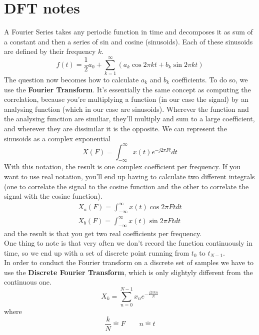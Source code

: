 \section{DFT notes}
 A Fourier Series takes any periodic function in time and decomposes it as sum of a constant and then a series of sin and cosine (sinusoids). Each of these sinusoids are defined by their frequency $k$. 
 \begin{equation}
     f(t) = \frac{1}{2}a_0 + \sum_{k=1}^\infty (a_k \cos 2 \pi k t + b_k \sin 2\pi kt)
 \end{equation} 
 The question now becomes how to calculate $a_k$ and $b_k$ coefficients. To do so, we use the \textbf{Fourier Transform}. It's essentially the same concept as computing the correlation, because you're multiplying a function (in our case the signal) by an analysing function (which in our case are sinusoids). Wherever the function and the analysing function are similiar, they'll multiply and sum to a large coefficient, and wherever they are dissimilar it is the opposite. We can represent the sinusoids as a complex exponential 
 \begin{equation}
     X(F) = \int_{-\infty}^\infty x(t) e^{-j 2 \pi Ft}dt
 \end{equation}
 With this notation, the result is one complex coefficient per frequency. If you want to use real notation, you'll end up having to calculate two different integrals (one to correlate the signal to the cosine function and the other to correlate the signal with the cosine function). 
 \begin{gather*}
     X_a(F) = \int_{-\infty}^\infty x(t) \cos 2 \pi Ft dt \\
     X_b(F) = \int_{-\infty}^\infty x(t) \sin 2 \pi Ft dt
 \end{gather*}
 and the result is that you get two real coefficients per frequency. \\
 One thing to note is that very often we don't record the function continuously in time, so we end up with a set of discrete point running from $t_0$ to $t_{N-1}$. \\
 In order to conduct the Fourier transform on a discrete set of samples we have to use the \textbf{Discrete Fourier Transform}, which is only slightyly different from the continuous one. 
 \begin{equation}
     X_k = \sum_{n=0}^{N-1} x_n e^{-\frac{j2 \pi kn}{N}}
 \end{equation}
where 
\begin{equation*}
    \frac{k}{N} \mathrel{\widehat{=}} F\qquad n\mathrel{\widehat{=}} t
\end{equation*} 
